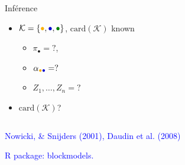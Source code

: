 \documentclass[compress,10pt]{beamer}
\begin{document}
\begin{frame}
\begin{center}
\begin{overlayarea}{\textwidth}{.5\textheight}
\begin{columns}
\begin{column}{.5\paperwidth}
\begin{small}
\begin{block}{Inférence}
              \begin{itemize}
              \item
                $\mathcal{K}=\{\textcolor{yellow!40!orange}{\bullet},\textcolor{blue!80!black}{\bullet},\textcolor{green!50!black}{\bullet}\}$,
                $\text{card}(\mathcal{K})$ known
             \begin{itemize}
             
              \item  $\pi_\bullet  =  ?$,
              \item      $\alpha_{\textcolor{yellow!40!orange}{\bullet}\textcolor{blue!80!black}{\bullet}}     =      ?$
\item $Z_1, \dots, Z_n  = ? $
\end{itemize}

\item $\text{card}(\mathcal{K})$?
              \end{itemize}
            \end{block}
          \end{small}
        \end{column}
      \end{columns}
    \end{overlayarea}
    \end{center}
    \medskip

    
    \textcolor{blue}{Nowicki, \& Snijders (2001), Daudin et al. (2008)}
    
    \bigskip
    
\textcolor{blue}{R package: blockmodels.}
%     

\end{frame}
\end{document}
